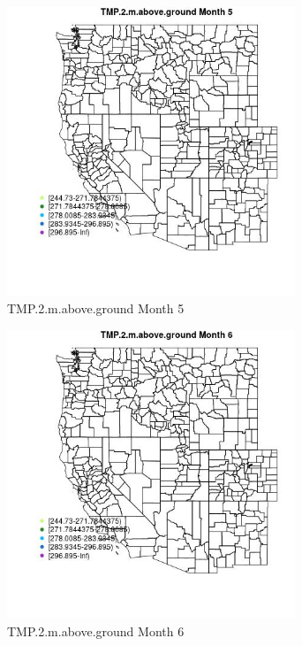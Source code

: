 \begin{figure} 
\centering  
\includegraphics[width=0.77\textwidth]{Code_Outputs/Report_ML_input_PM25_Step4_part_e_de_duplicated_aveswNAs_MapObsMo5TMP2maboveground.jpg} 
\caption{\label{fig:Report_ML_input_PM25_Step4_part_e_de_duplicated_aveswNAsMapObsMo5TMP2maboveground}TMP.2.m.above.ground Month 5} 
\end{figure} 
 

\clearpage 

\begin{figure} 
\centering  
\includegraphics[width=0.77\textwidth]{Code_Outputs/Report_ML_input_PM25_Step4_part_e_de_duplicated_aveswNAs_MapObsMo6TMP2maboveground.jpg} 
\caption{\label{fig:Report_ML_input_PM25_Step4_part_e_de_duplicated_aveswNAsMapObsMo6TMP2maboveground}TMP.2.m.above.ground Month 6} 
\end{figure} 
 

